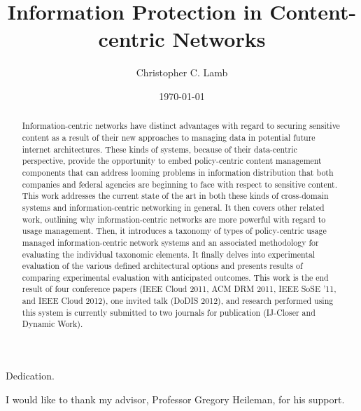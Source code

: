 \documentclass[botnum,fleqn,final]{unmeethesis}
\newcommand{\mytitle}{Information Protection in Content-centric Networks}
\newcommand{\myauthor}{Christopher C. Lamb}
\begin{document}
\frontmatter

\title{\mytitle}
\author{\myauthor}





\date{\today}

\maketitle

\makecopyright

\begin{dedication}
   Dedication.
\end{dedication}

\begin{acknowledgments}
   \vspace{1.1in}
   I would like to thank my advisor, Professor Gregory Heileman, for his support.
\end{acknowledgments}

\maketitleabstract

\begin{abstract}
Information-centric networks have distinct advantages with regard to securing sensitive content as a result of their new approaches to managing data in potential future internet architectures.  These kinds of systems, because of their data-centric perspective, provide the opportunity to embed  policy-centric content management components that can address looming problems in information distribution that both companies and federal agencies are beginning to face with respect to sensitive content.  This work addresses the current state of the art in both these kinds of cross-domain systems and information-centric networking in general.  It then covers other related work, outlining why information-centric networks are more powerful with regard to usage management.  Then, it introduces a taxonomy of types of policy-centric usage managed information-centric network systems and an associated methodology for evaluating the individual taxonomic elements.  It finally delves into experimental evaluation of the various defined architectural options and presents results of comparing experimental evaluation with anticipated outcomes. This work is the end result of four conference papers (IEEE Cloud 2011, ACM DRM 2011, IEEE SoSE '11, and IEEE Cloud 2012), one invited talk (DoDIS 2012), and research performed using this system is currently submitted to two journals for publication (IJ-Closer and Dynamic Work).
\end{abstract}
\end{document}
